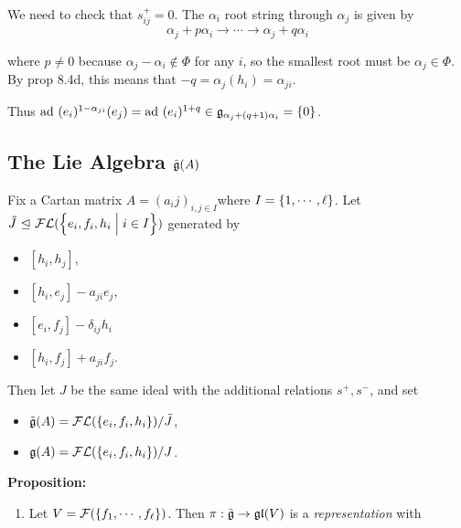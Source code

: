 We need to check that \(s^+_{ij} = 0\). The \(\alpha_i\) root string
through \(\alpha_j\) is given by \[
\alpha_j + p\alpha_i \to \cdots \to \alpha_j + q \alpha_i
\]

where \(p\neq 0\) because \(\alpha_j - \alpha_i \not\in\Phi\) for any
\(i\), so the smallest root must be \(\alpha_j \in \Phi\). By prop 8.4d,
this means that \(-q = \alpha_j(h_i) = \alpha_{ji}\).

Thus
\(\mathrm{ad}~(e_i)^{1-\alpha_{ji}} (e_j) = \mathrm{ad}~(e_i)^{1+q} \in {\mathfrak{g}}_{\alpha_j + (q+1)\alpha_i} = \left\{{0}\right\}\).

\hypertarget{the-lie-algebra-tilde-liega}{%
\subsection{\texorpdfstring{The Lie Algebra
\(\tilde {{\mathfrak{g}}}(A)\)}{The Lie Algebra \textbackslash tilde \textbackslash lieg(A)}}\label{the-lie-algebra-tilde-liega}}

Fix a Cartan matrix \(A = (a_ij)_{i, j \in I}\)where
\(I = \left\{{1, \cdots, \ell}\right\}\). Let
\(\tilde J {~\trianglelefteq~} \mathcal{FL}(\left\{{e_i, f_i, h_i \mathrel{\Big|} i\in I}\right\})\)
generated by

\begin{itemize}
\tightlist
\item
  \([h_i, h_j]\),
\item
  \([h_i, e_j] - a_{ji}e_j\),
\item
  \([e_i, f_j] - \delta_{ij} h_i\)
\item
  \([h_i, f_j] + a_{ji} f_j\).
\end{itemize}

Then let \(J\) be the same ideal with the additional relations
\(s^+, s^-\), and set

\begin{itemize}
\tightlist
\item
  \(\tilde {{\mathfrak{g}}}(A) = \mathcal{FL}(\left\{{e_i, f_i, h_i}\right\}) / \tilde J\),
\item
  \({\mathfrak{g}}(A) = \mathcal{FL}(\left\{{e_i, f_i, h_i}\right\}) / J\).
\end{itemize}

\textbf{Proposition:}

\begin{enumerate}
\def\labelenumi{\alph{enumi}.}
\tightlist
\item
  Let \(V = \mathcal{F}(\left\{{f_1, \cdots, f_\ell}\right\})\). Then
  \(\pi: \tilde {{\mathfrak{g}}} \to {\mathfrak{gl}}(V)\) is a \emph{representation} with
\end{enumerate}

